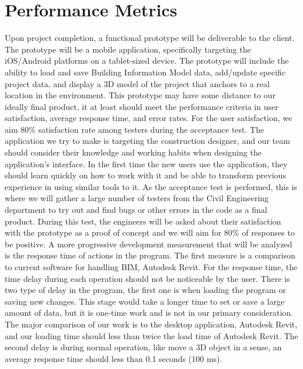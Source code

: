 \documentclass[onecolumn, draftclsnofoot,10pt, compsoc]{IEEEtran}
\begin{document}
\section{Performance Metrics}
Upon project completion, a functional prototype will be deliverable to the client. The prototype will be a mobile application, specifically targeting the iOS/Android platforms on a tablet-sized device. The prototype will include the ability to load and save Building Information Model data, add/update specific project data, and display a 3D model of the project that anchors to a real location in the environment. \newline
This prototype may have some distance to our ideally final product, it at least should meet the performance criteria in user satisfaction, average response time, and error rates. \newline
For the user satisfaction, we aim 80\% satisfaction rate among testers during the acceptance test. The application we try to make is targeting the construction designer, and our team should consider their knowledge and working habits when designing the application’s interface. In the first time the new users use the application, they should learn quickly on how to work with it and be able to transform previous experience in using similar tools to it. As the acceptance test is performed, this is where we will gather a large number of testers from the Civil Engineering department to try out and find bugs or other errors in the code as a final product. During this test, the engineers will be asked about their satisfaction with the prototype as a proof of concept and we will aim for 80\% of responses to be positive. A more progressive development measurement that will be analyzed is the response time of actions in the program. The first measure is a comparison to current software for handling BIM, Autodesk Revit. \newline
For the response time, the time delay during each operation should not be noticeable by the user. There is two type of delay in the program, the first one is when loading the program or saving new changes. This stage would take a longer time to set or save a large amount of data, but it is one-time work and is not in our primary consideration. The major comparison of our work is to the desktop application, Autodesk Revit, and our loading time should less than twice the load time of Autodesk Revit. The second delay is during normal operation, like move a 3D object in a sense, an average response time should less than 0.1 seconds (100 ms). \newline
\end{document}
